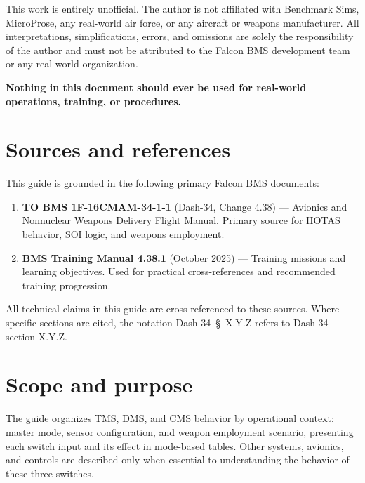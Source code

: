 \documentclass[11pt, a4paper, twoside]{report}
\newcommand{\dashref}[1]{Dash-34~\S~#1}
\begin{document}
This work is entirely unofficial. The author is not affiliated with Benchmark Sims, MicroProse, any real-world air force, or any aircraft or weapons manufacturer. All interpretations, simplifications, errors, and omissions are solely the responsibility of the author and must not be attributed to the Falcon BMS development team or any real-world organization.

\textbf{Nothing in this document should ever be used for real-world operations, training, or procedures.}

\section{Sources and references}
\label{sec:C1-S1}

This guide is grounded in the following primary Falcon BMS documents:

\begin{enumerate}
	\item \textbf{TO BMS 1F-16CMAM-34-1-1} (Dash-34, Change 4.38) --- Avionics and Nonnuclear Weapons Delivery Flight Manual. Primary source for HOTAS behavior, SOI logic, and weapons employment.
	\item \textbf{BMS Training Manual 4.38.1} (October 2025) --- Training missions and learning objectives. Used for practical cross-references and recommended training progression.
\end{enumerate}

All technical claims in this guide are cross-referenced to these sources. Where specific sections are cited, the notation \dashref{X.Y.Z} refers to Dash-34 section X.Y.Z.

\section{Scope and purpose}
\label{sec:C1-S2}

The guide organizes TMS, DMS, and CMS behavior by operational context: master mode, sensor configuration, and weapon employment scenario, presenting each switch input and its effect in mode-based tables. Other systems, avionics, and controls are described only when essential to understanding the behavior of these three switches.
\end{document}
